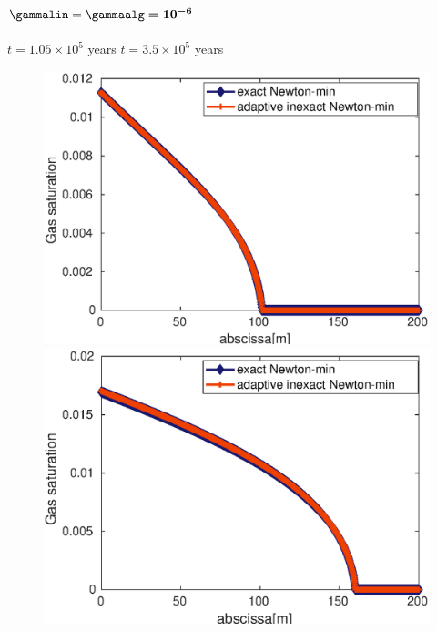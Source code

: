 \begin{frame}
\begin{overprint}
\vspace{0.2 cm}
\textcolor{red}{$\bm \gammalin= \bm \gammaalg \bm = {\bm {10^{-6}}}$}
\\\\
\textcolor{cadmiumgreen}{\hspace{2 cm} $t = 1.05 \times 10^5$ years \hspace{5 cm} $t = 3.5 \times 10^5$ years}
\begin{figure}
\centering
\includegraphics[width=0.48 \textwidth]{fig_article_chap_3/comparaison_plot_gas_saturations_exact_adapt_inexact_gamma_lin_10-6_gamma_alg_10-3_nt_21}
\includegraphics[width=0.48 \textwidth]{fig_article_chap_3/comparaison_plot_gas_saturations_exact_adapt_inexact_gamma_lin_gamma_alg_10-3_nt_70}
\end{figure}

 \end{overprint} 

\end{frame}
